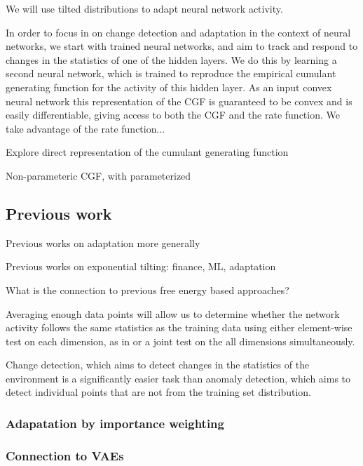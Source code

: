 \documentclass[11pt]{article}      %
\begin{document}
We will use tilted distributions to adapt neural network activity.



In order to focus in on change detection and adaptation in the context of neural networks, we start with trained neural networks, and aim to track and respond to changes in the statistics of one of the hidden layers. 
We do this by learning a second neural network, which is trained to reproduce the empirical cumulant generating function for the activity of this hidden layer.
As an input convex neural network \cite{amos_input_2017} this representation of the CGF is guaranteed to be convex and is easily differentiable, giving access to both the CGF and the rate function.
We take advantage of the rate function...




Explore direct representation of the cumulant generating function 

Non-parameteric CGF, with parameterized 



\subsection{Previous work}


Previous works on adaptation more generally

Previous works on exponential tilting: finance, ML, adaptation 


What is the connection to previous free energy based approaches?


Averaging enough data points will allow us to determine whether the network activity follows the same statistics as the training data using either element-wise test on each dimension, as in \cite{rabanser_failing_2019} or a joint test on the all dimensions simultaneously.


Change detection, which aims to detect changes in the statistics of the environment is a significantly easier task than anomaly detection, which aims to detect individual points that are not from the training set distribution.


\subsubsection{Adapatation by importance weighting}





\subsubsection{Connection to VAEs}
\end{document}
